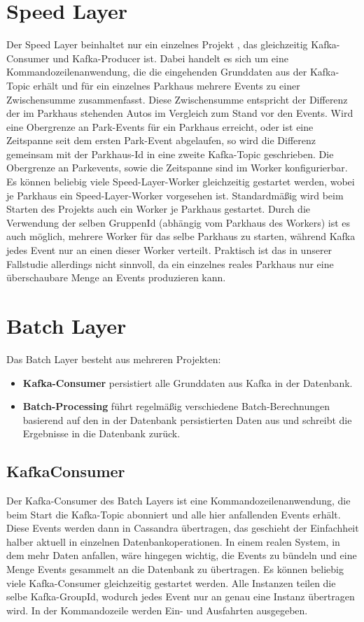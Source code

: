 \section{Speed Layer}
Der Speed Layer beinhaltet nur ein einzelnes Projekt , das gleichzeitig Kafka-Consumer und Kafka-Producer ist.
Dabei handelt es sich um eine Kommandozeilenanwendung, die die eingehenden Grunddaten aus der Kafka-Topic  erhält und für ein einzelnes Parkhaus mehrere Events zu einer Zwischensumme zusammenfasst.
Diese Zwischensumme entspricht der Differenz der im Parkhaus stehenden Autos im Vergleich zum Stand vor den Events.
Wird eine Obergrenze an Park-Events für ein Parkhaus erreicht, oder ist eine Zeitspanne seit dem ersten Park-Event abgelaufen, so wird die Differenz gemeinsam mit der Parkhaus-Id in eine zweite Kafka-Topic  geschrieben.
Die Obergrenze an Parkevents, sowie die Zeitspanne sind im Worker konfigurierbar.
Es können beliebig viele Speed-Layer-Worker gleichzeitig gestartet werden, wobei je Parkhaus ein Speed-Layer-Worker vorgesehen ist.
Standardmäßig wird beim Starten des Projekts auch ein Worker je Parkhaus gestartet.
Durch die Verwendung der selben GruppenId (abhängig vom Parkhaus des Workers) ist es auch möglich, mehrere Worker für das selbe Parkhaus zu starten, während Kafka jedes Event nur an einen dieser Worker verteilt.
Praktisch ist das in unserer Fallstudie allerdings nicht sinnvoll, da ein einzelnes reales Parkhaus nur eine überschaubare Menge an Events produzieren kann.


\section{Batch Layer}
Das Batch Layer besteht aus mehreren Projekten:
\begin{itemize}
    \item \textbf{Kafka-Consumer} persistiert alle Grunddaten aus Kafka in der Datenbank.
    \item \textbf{Batch-Processing} führt regelmäßig verschiedene Batch-Berechnungen basierend auf den in der Datenbank persistierten Daten aus und schreibt die Ergebnisse in die Datenbank zurück. 
\end{itemize}

\subsection{KafkaConsumer}
Der Kafka-Consumer des Batch Layers ist eine Kommandozeilenanwendung, die beim Start die Kafka-Topic  abonniert und alle hier anfallenden Events erhält.
Diese Events werden dann in Cassandra übertragen, das geschieht der Einfachheit halber aktuell in einzelnen Datenbankoperationen.
In einem realen System, in dem mehr Daten anfallen, wäre hingegen wichtig, die Events zu bündeln und eine Menge Events gesammelt an die Datenbank zu übertragen.
Es können beliebig viele Kafka-Consumer gleichzeitig gestartet werden.
Alle Instanzen teilen die selbe Kafka-GroupId, wodurch jedes Event nur an genau eine Instanz übertragen wird.
In der Kommandozeile werden Ein- und Ausfahrten ausgegeben.

